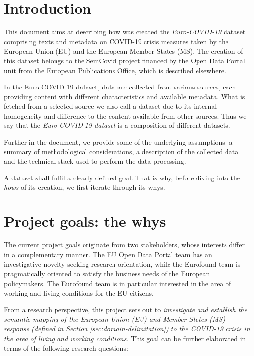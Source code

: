 
\section{Introduction}

This document aims at describing how was created the \textit{Euro-COVID-19} dataset comprising texts and metadata on COVID-19 crisis measures taken by the European Union (EU) and the European Member States (MS). The creation of this dataset belongs to the SemCovid project financed by the Open Data Portal unit from the European Publications Office, which is described elsewhere. 

In the Euro-COVID-19 dataset, data are collected from various sources, each providing content with different characteristics and available metadata. What is fetched from a selected source we also call a dataset due to its internal homogeneity and difference to the content available from other sources. Thus we say that the \textit{Euro-COVID-19 dataset} is a composition of different datasets.

Further in the document, we provide some of the underlying assumptions, a summary of methodological considerations, a description of the collected data and the technical stack used to perform the data processing. 

A dataset shall fulfil a clearly defined goal. That is why, before diving into the \textit{hows} of its creation, we first iterate through its whys.

\section{Project goals: the whys}
\label{sec:goals}

The current project goals originate from two stakeholders, whose interests differ in a complementary manner. The EU Open Data Portal team has an investigative novelty-seeking research orientation, while the Eurofound team is pragmatically oriented to satisfy the business needs of the European policymakers. The Eurofound team is in particular interested in the area of working and living conditions for the EU citizens.

From a research perspective, this project sets out to \textit{investigate and establish the semantic mapping of the European Union (EU) and Member States (MS) response (defined in Section \ref{sec:domain-delimitation}) to the COVID-19 crisis in the area of living and working conditions.} This goal can be further elaborated in terms of the following research questions:

